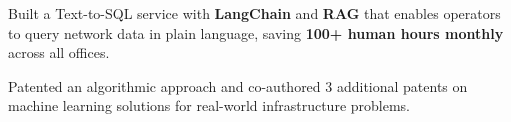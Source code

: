 \begin{cventries}
{\begin{cvitems}
        \item {Built a Text-to-SQL service with \textbf{LangChain} and \textbf{RAG} that enables operators to query network data in plain language, saving \textbf{100+ human hours monthly} across all offices.}
        \item {Patented an algorithmic approach and co-authored 3 additional patents on machine learning solutions for real-world infrastructure problems.}
      \end{cvitems}
    }

\end{cventries}
